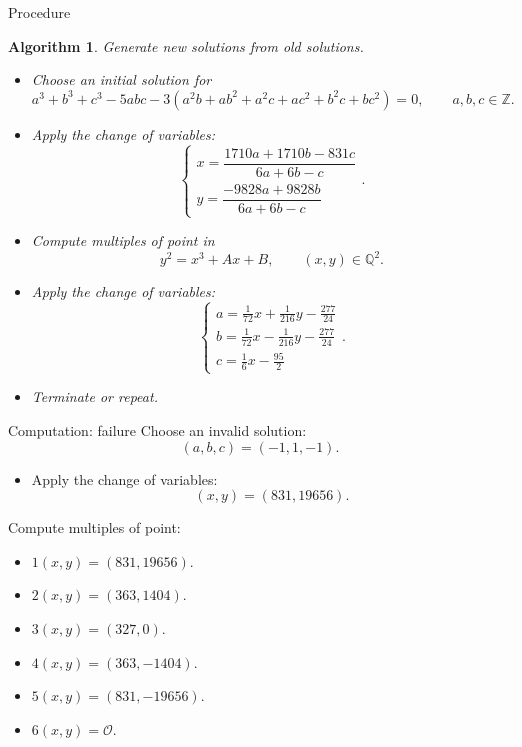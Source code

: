 \documentclass[8pt,t]{beamer}
\newcommand{\rb}[1]{\left( #1 \right)}
\newtheorem{algorithm}{Algorithm}
\newcommand{\Q}{\mathbb{Q}}
\newcommand{\Z}{\mathbb{Z}}
\newcommand{\OO}{\mathcal{O}}
\begin{document}
\begin{frame}{Procedure}
\begin{algorithm}
Generate new solutions from old solutions.
\begin{itemize}
\item<2-> Choose an initial solution for
$$ a^3 + b^3 + c^3 - 5abc - 3\rb{a^2b + ab^2 + a^2c + ac^2 + b^2c + bc^2} = 0, \qquad a, b, c \in \Z. $$
\item<3-> Apply the change of variables:
$$
\begin{cases}
x = \dfrac{1710a + 1710b - 831c}{6a + 6b - c} \\
y = \dfrac{-9828a + 9828b}{6a + 6b - c}
\end{cases}.
$$
\item<4-> Compute multiples of point in
$$ y^2 = x^3 + Ax + B, \qquad \rb{x, y} \in \Q^2. $$
\item<5-> Apply the change of variables:
$$
\begin{cases}
a = \tfrac{1}{72}x + \tfrac{1}{216}y - \tfrac{277}{24} \\
b = \tfrac{1}{72}x - \tfrac{1}{216}y - \tfrac{277}{24} \\
c = \tfrac{1}{6}x - \tfrac{95}{2}
\end{cases}.
$$
\item<6-> Terminate or repeat.
\end{itemize}
\end{algorithm}
\end{frame}

\begin{frame}{Computation: failure}
Choose an invalid solution:
$$ \rb{a, b, c} = \rb{-1, 1, -1}. $$
\pause
\begin{itemize}
\item Apply the change of variables:
$$ \rb{x, y} = \rb{831, 19656}. $$
\end{itemize}
\pause
Compute multiples of point:
\begin{itemize}
\item<4-> $ 1\rb{x, y} = \rb{831, 19656} $.
\item<5-> $ 2\rb{x, y} = \rb{363, 1404} $.
\item<6-> $ 3\rb{x, y} = \rb{327, 0} $.
\item<7-> $ 4\rb{x, y} = \rb{363, -1404} $.
\item<8-> $ 5\rb{x, y} = \rb{831, -19656} $.
\item<9-> $ 6\rb{x, y} = \OO $.
\end{itemize}
\end{frame}
\end{document}
